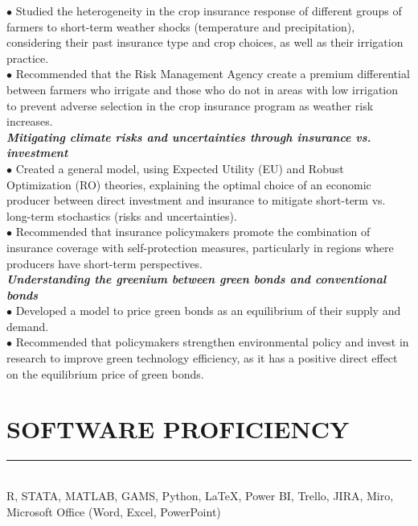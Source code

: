 \documentclass[overlapped]{res}
\begin{document}
\begin{resume}
\begin{position}
$\bullet$ Studied the heterogeneity in the crop insurance response of different groups of farmers
to short-term weather shocks (temperature and precipitation), considering their
past insurance type and crop choices, as well as their irrigation practice.\\
$\bullet$ Recommended that the Risk Management Agency create a premium differential between farmers who irrigate and those who do not in areas with low irrigation to prevent adverse selection in the crop insurance program as weather risk increases.\\[1.5mm]
\textbf{\textit{Mitigating climate risks and uncertainties through insurance vs. investment}}\\
$\bullet$ Created a general model, using Expected Utility (EU) and Robust Optimization (RO) theories, explaining the optimal choice of an economic producer
between direct investment and insurance to mitigate short-term vs. long-term
stochastics (risks and uncertainties).\\
$\bullet$
Recommended that insurance policymakers promote the combination of insurance coverage with self-protection measures, particularly in regions where producers have short-term perspectives.\\[2 mm]
\textbf{\textit{Understanding the greenium between green bonds and conventional bonds}}\\
$\bullet$ Developed a model to price green bonds as an equilibrium of their supply and demand.\\
$\bullet$ Recommended that policymakers strengthen environmental policy and invest in research to improve green technology efficiency, as it has a positive direct effect on
the equilibrium price of green bonds.
\end{position}

\section{SOFTWARE PROFICIENCY}
\vspace{-3 mm}
\noindent\rule{\textwidth}{1pt}\\
R, STATA, MATLAB, GAMS, Python, LaTeX, Power BI, Trello, JIRA, Miro, Microsoft Office (Word, Excel, PowerPoint)

\end{resume}
\end{document}
